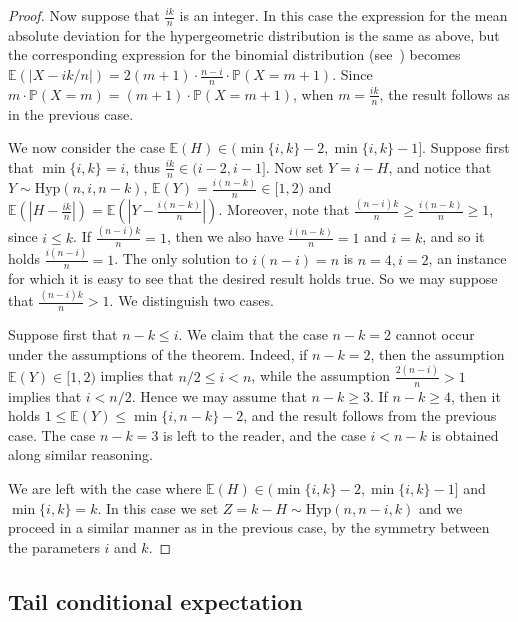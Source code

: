 \documentclass[10pt]{article}
\theoremstyle{plain}
\theoremstyle{definition}
\theoremstyle{remark}
\newcommand{\Prb}{\mathbb{P}}
\newcommand{\Exp}{\mathbb{E}}
\begin{document}
\begin{proof}
Now suppose that $\frac{ik}{n}$ is an integer. In this case the expression for the mean absolute deviation for the hypergeometric distribution is  the same as above, but the corresponding expression for the binomial distribution 
(see~\cite[Formula~(1.1)]{Diaconis_Zabell}) becomes    
$\Exp(|X-ik/n|) = 2(m+1)\cdot\frac{n-i}{n}\cdot \Prb(X=m+1)$. 
Since $m\cdot \Prb(X=m)= (m+1)\cdot \Prb(X=m+1)$, when $m=\frac{ik}{n}$, the result follows as in the previous case. 

We now consider the case $\Exp(H)\in (\min\{i,k\}-2,\min\{i,k\}-1]$. Suppose first that $\min\{i,k\}=i$, thus $\frac{ik}{n}\in (i-2,i-1]$. Now set $Y= i-H$, and notice that $Y\sim\text{Hyp}(n,i,n-k)$,  $\Exp(Y)=\frac{i(n-k)}{n}\in [1,2)$ and  
$\Exp(|H-\frac{ik}{n}|) = \Exp(|Y-\frac{i(n-k)}{n}|)$. 
Moreover, note that $\frac{(n-i)k}{n}\ge \frac{i(n-k)}{n} \ge 1$, since $i\le k$. If $\frac{(n-i)k}{n}=1$, then we also have $\frac{i(n-k)}{n}=1$ and $i=k$, and so it holds $\frac{i(n-i)}{n}=1$. The only solution to $i(n-i)=n$ is  $n=4,i=2$, an instance for which it is easy to see that the desired result holds true. 
So we may suppose that $\frac{(n-i)k}{n} >1$. 
We  distinguish two cases. 


Suppose first that $n-k\le i$. 
We claim that the case $n-k=2$ cannot occur under the assumptions of the theorem. Indeed, if $n-k=2$, then the assumption $\Exp(Y)\in [1,2)$ implies that 
$n/2\le i <n$, while the assumption $\frac{2(n-i)}{n}>1$ implies that $i<n/2$. 
Hence we may assume that $n-k\ge 3$. 
If $n-k\ge 4$, then 
it holds $1\le \Exp(Y)\le \min\{i,n-k\}-2$, 
and the result follows from the previous case. The case $n-k=3$ is left to the reader, and the  case $i< n-k$ is obtained along similar reasoning.  

We are left with the case where 
$\Exp(H)\in (\min\{i,k\}-2,\min\{i,k\}-1]$ and $\min\{i,k\}=k$. 
In this case we set $Z = k-H \sim \text{Hyp}(n,n-i,k)$ and we proceed in a similar manner as in the previous case, by the symmetry between the parameters $i$ and $k$.   
\end{proof}


\subsection{Tail conditional expectation}
\label{hyp_dist3} 
\end{document}

